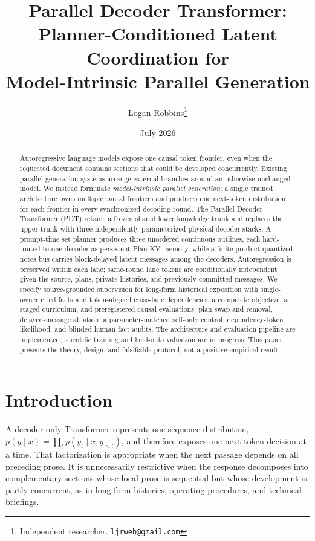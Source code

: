 \documentclass[10pt]{article}
\title{Parallel Decoder Transformer:\\
Planner-Conditioned Latent Coordination for\\
Model-Intrinsic Parallel Generation}
\author{Logan Robbins\thanks{Independent researcher. \texttt{ljrweb@gmail.com}}}
\date{July 2026}
\newcommand{\pdt}{\textsc{PDT}}
\begin{document}
\maketitle

\begin{abstract}
Autoregressive language models expose one causal token frontier, even when the
requested document contains sections that could be developed concurrently.
Existing parallel-generation systems arrange external branches around an
otherwise unchanged model. We instead formulate \emph{model-intrinsic parallel
generation}: a single trained architecture owns multiple causal frontiers and
produces one next-token distribution for each frontier in every synchronized
decoding round. The Parallel Decoder Transformer (\pdt) retains a frozen
shared lower knowledge trunk and replaces the upper trunk with three
independently parameterized physical decoder stacks. A prompt-time set planner
produces three unordered continuous outlines, each hard-routed to one decoder
as persistent Plan-KV memory, while a finite product-quantized notes bus
carries block-delayed latent messages among the decoders. Autoregression is
preserved within each lane; same-round lane tokens are conditionally
independent given the source, plans, private histories, and previously
committed messages. We specify source-grounded supervision for long-form
historical exposition with single-owner cited facts and token-aligned
cross-lane dependencies, a composite objective, a staged curriculum, and
preregistered causal evaluations: plan swap and removal, delayed-message
ablation, a parameter-matched self-only control, dependency-token likelihood,
and blinded human fact audits. The architecture and evaluation pipeline are
implemented; scientific training and held-out evaluation are in progress.
This paper presents the theory, design, and falsifiable protocol, not a
positive empirical result.
\end{abstract}

\section{Introduction}
\label{sec:introduction}

A decoder-only Transformer represents one sequence distribution,
\(
p(y\mid x)=\prod_t p(y_t\mid x,y_{<t})
\),
and therefore exposes one next-token decision at a time. That factorization is
appropriate when the next passage depends on all preceding prose. It is
unnecessarily restrictive when the response decomposes into complementary
sections whose local prose is sequential but whose development is partly
concurrent, as in long-form histories, operating procedures, and technical
briefings.
\end{document}
